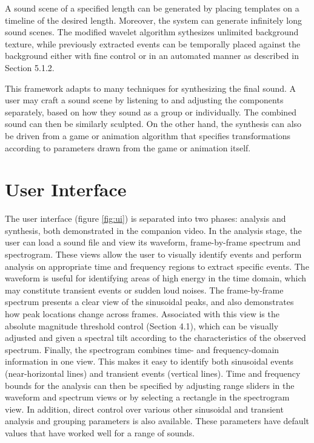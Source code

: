 \documentclass[review]{acmsiggraph}      %
\begin{document}
A sound scene of a specified length can be generated by placing templates 
on a timeline of the desired length. Moreover, the system can generate infinitely long sound 
scenes. The modified wavelet algorithm sythesizes unlimited background texture, while 
previously extracted events can be temporally placed against the background either with fine 
control or in an automated manner as described in Section 5.1.2. 

This framework adapts to many techniques for synthesizing the final sound. A user may 
craft a sound scene by listening to and adjusting the components separately, based on how they 
sound as a group or individually. The combined sound can then be similarly sculpted. On the other 
hand, the synthesis can also be driven from a game or animation algorithm that specifies 
transformations according to parameters drawn from the game or animation itself.


\section{User Interface}

The user interface (figure \ref{fig:ui}) is separated into two phases: analysis and 
synthesis, both demonstrated in the companion video. 
In the analysis stage, the user can load a sound file and view its waveform, 
frame-by-frame spectrum and spectrogram. These views allow the user to visually 
identify events and perform analysis on appropriate time and frequency regions to
 extract specific events. The waveform is useful for identifying areas of high 
energy in the time domain, which may constitute transient events or sudden loud 
noises. The frame-by-frame spectrum presents a clear view of the sinusoidal 
peaks, and also demonstrates how peak locations change across frames. 
Associated with this view is the absolute magnitude threshold control (Section 4.1), 
which can be visually adjusted and given a spectral tilt according to the characteristics 
of the observed spectrum. Finally, the spectrogram combines time- and frequency-domain 
information in one view. This makes it easy to identify both sinusoidal events 
(near-horizontal lines) and transient events (vertical lines). Time and frequency 
bounds for the analysis can then be specified by adjusting range sliders in the waveform 
and spectrum views or by selecting a rectangle in the spectrogram view. In addition, 
direct control over various other sinusoidal and transient analysis and 
grouping parameters is also available. These parameters have default 
values that have worked well for a range of sounds. 
\end{document}
